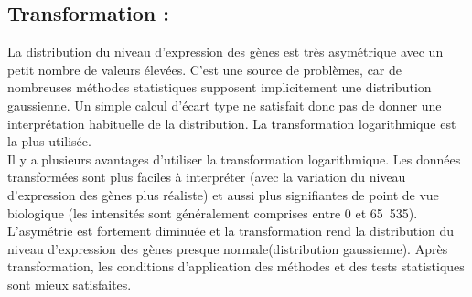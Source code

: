 \documentclass[a4paper,10pt]{article}
\begin{document}
\subsection{Transformation :}
La distribution du niveau d'expression des gènes est très asymétrique avec un petit nombre de valeurs élevées. C’est une source de problèmes, car de nombreuses méthodes statistiques supposent implicitement une distribution gaussienne. 
Un simple calcul d’écart type ne satisfait donc pas de donner une interprétation habituelle de la distribution. La transformation logarithmique est la plus utilisée. 
\\Il y a plusieurs avantages d’utiliser la transformation logarithmique. Les données transformées sont plus faciles à interpréter (avec la variation du niveau d’expression des gènes plus réaliste) et aussi plus signifiantes de point de vue biologique (les intensités sont généralement comprises entre 0 et 65 535). 
L’asymétrie est fortement diminuée et la transformation  rend la distribution du niveau d’expression des gènes presque normale(distribution gaussienne).
Après transformation, les conditions d'application des méthodes et des tests statistiques sont mieux satisfaites. 
\end{document}
